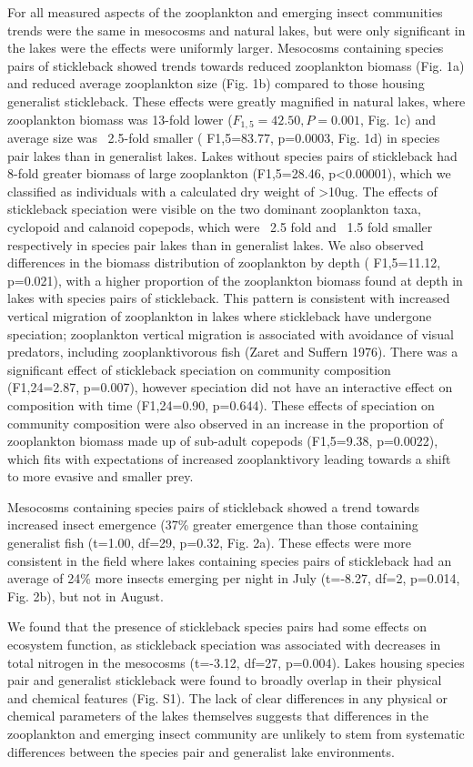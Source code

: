 \documentclass[11pt]{article}
\begin{document}
For all measured aspects of the zooplankton and emerging insect communities trends were the same in mesocosms and natural lakes, but were only significant in the lakes were the effects were uniformly larger.  Mesocosms containing species pairs of stickleback showed trends towards reduced zooplankton biomass (Fig. 1a) and reduced average zooplankton size (Fig. 1b) compared to those housing generalist stickleback.  These effects were greatly magnified in natural lakes, where zooplankton biomass was 13-fold lower ($F_{1,5}=42.50, P=0.001$, Fig. 1c) and average size was ~2.5-fold smaller ( F1,5=83.77, p=0.0003, Fig. 1d) in species pair lakes than in generalist lakes.  Lakes without species pairs of stickleback had 8-fold greater biomass of large zooplankton (F1,5=28.46, p<0.00001), which we classified as individuals with a calculated dry weight of >10ug.  The effects of stickleback speciation were visible on the two dominant zooplankton taxa, cyclopoid and calanoid copepods, which were ~2.5 fold and ~1.5 fold smaller respectively in species pair lakes than in generalist lakes.  We also observed differences in the biomass distribution of zooplankton by depth ( F1,5=11.12, p=0.021), with a higher proportion of the zooplankton biomass found at depth in lakes with species pairs of stickleback.  This pattern is consistent with increased vertical migration of zooplankton in lakes where stickleback have undergone speciation; zooplankton vertical migration is associated with avoidance of visual predators, including zooplanktivorous fish (Zaret and Suffern 1976).  There was a significant effect of stickleback speciation on community composition (F1,24=2.87, p=0.007), however speciation did not have an interactive effect on composition with time (F1,24=0.90, p=0.644).  These effects of speciation on community composition were also observed in an increase in the proportion of zooplankton biomass made up of sub-adult copepods (F1,5=9.38, p=0.0022), which fits with expectations of increased zooplanktivory leading towards a shift to more evasive and smaller prey.

Mesocosms containing species pairs of stickleback showed a trend towards increased insect emergence (37\% greater emergence than those containing generalist fish (t=1.00, df=29, p=0.32, Fig. 2a).  These effects were more consistent in the field where lakes containing species pairs of stickleback had an average of 24\% more insects emerging per night in July (t=-8.27, df=2, p=0.014, Fig. 2b), but not in August.   

We found that the presence of stickleback species pairs had some effects on ecosystem function, as stickleback speciation was associated with decreases in total nitrogen in the mesocosms (t=-3.12, df=27, p=0.004).  Lakes housing species pair and generalist stickleback were found to broadly overlap in their physical and chemical features (Fig. S1).  The lack of clear differences in any physical or chemical parameters of the lakes themselves suggests that differences in the zooplankton and emerging insect community are unlikely to stem from systematic differences between the species pair and generalist lake environments.  
\end{document}
